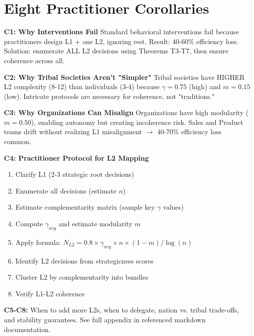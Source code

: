 
\section{Eight Practitioner Corollaries}

\textbf{C1: Why Interventions Fail}
Standard behavioral interventions fail because practitioners design L1 + one L2, ignoring rest. Result: 40-60\% efficiency loss. Solution: enumerate ALL L2 decisions using Theorems T3-T7, then ensure coherence across all.

\textbf{C2: Why Tribal Societies Aren't "Simpler"}
Tribal societies have HIGHER L2 complexity (8-12) than individuals (3-4) because $\gamma = 0.75$ (high) and $m = 0.15$ (low). Intricate protocols are necessary for coherence, not "traditions."

\textbf{C3: Why Organizations Can Misalign}
Organizations have high modularity ($m = 0.50$), enabling autonomy but creating incoherence risk. Sales and Product teams drift without realizing L1 misalignment $\to$ 40-70\% efficiency loss common.

\textbf{C4: Practitioner Protocol for L2 Mapping}
\begin{enumerate}[nosep]
    \item Clarify L1 (2-3 strategic root decisions)
    \item Enumerate all decisions (estimate $n$)
    \item Estimate complementarity matrix (sample key $\gamma$ values)
    \item Compute $\gamma_{avg}$ and estimate modularity $m$
    \item Apply formula: $N_{L2} = 0.8 \times \gamma_{avg} \times n \times (1-m) / \log(n)$
    \item Identify L2 decisions from strategicness scores
    \item Cluster L2 by complementarity into bundles
    \item Verify L1-L2 coherence
\end{enumerate}

\textbf{C5-C8:} When to add more L2s, when to delegate, nation vs. tribal trade-offs, and stability guarantees. See full appendix in referenced markdown documentation.



